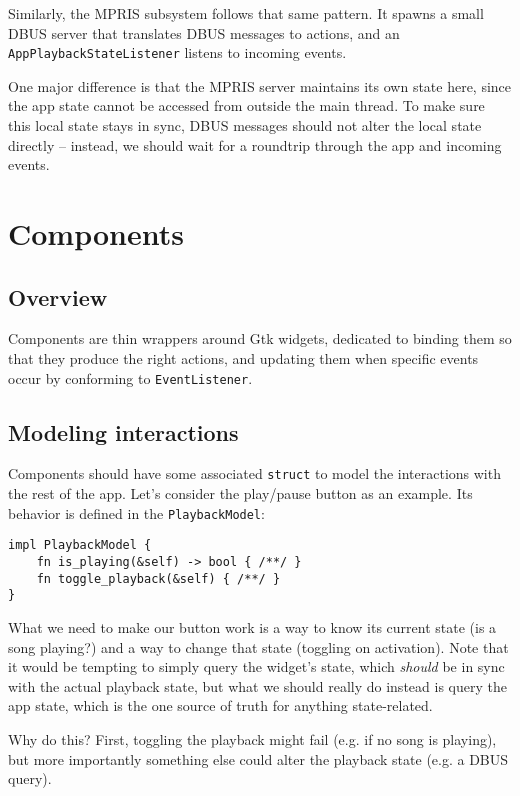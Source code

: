\documentclass[12pt, a4paper]{article}
\begin{document}
Similarly, the MPRIS subsystem follows that same pattern. It spawns a small DBUS server that translates DBUS messages to actions, and an \texttt{AppPlaybackStateListener} listens to incoming events.

One major difference is that the MPRIS server maintains its own state here, since the app state cannot be accessed from outside the main thread. To make sure this local state stays in sync, DBUS messages should not alter the local state directly -- instead, we should wait for a roundtrip through the app and incoming events.

\section{Components}

\subsection{Overview}

Components are thin wrappers around Gtk widgets, dedicated to binding them so that they produce the right actions, and updating them when specific events occur by conforming to \texttt{EventListener}.

\subsection{Modeling interactions}

Components should have some associated \texttt{struct} to model the interactions with the rest of the app. Let's consider the play/pause button as an example. Its behavior is defined in the \texttt{PlaybackModel}:

\begin{verbatim}
impl PlaybackModel {
    fn is_playing(&self) -> bool { /**/ }
    fn toggle_playback(&self) { /**/ }
}
\end{verbatim}

What we need to make our button work is a way to know its current state (is a song playing?) and a way to change that state (toggling on activation). Note that it would be tempting to simply query the widget's state, which \emph{should} be in sync with the actual playback state, but what we should really do instead is query the app state, which is the one source of truth for anything state-related.

Why do this? First, toggling the playback might fail (e.g. if no song is playing), but more importantly something else could alter the playback state (e.g. a DBUS query).
\end{document}
